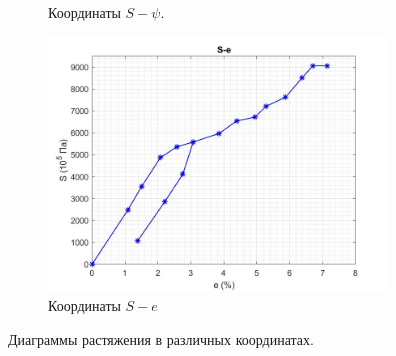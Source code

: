 \documentclass[12pt, a4paper]{article}
\begin{document}
\begin{figure}[h]
\begin{subfigure}{.5\textwidth}
            \caption{Координаты $S-\psi$.}
            \label{fig::fig3}
        \end{subfigure}%
        \begin{subfigure}{.5\textwidth}
            \centering
            \includegraphics[width = 9cm]{fig_4.jpg}
            \caption{Координаты $S-e$}
            \label{fig::fig4}
        \end{subfigure}
        \caption{Диаграммы растяжения в различных координатах.}
        \label{fig}
    \end{figure}
    
    \newpage
    
\end{document}
